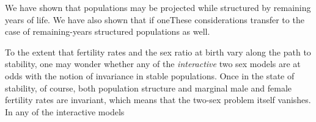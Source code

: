 We have shown that populations may be projected while structured by
remaining years of life. We have also shown that if oneThese considerations
transfer to the case of remaining-years structured populations as well. 

To the extent that fertility rates and the sex ratio at
birth vary along the path to stability, one may wonder whether any of the
\textit{interactive} two sex models are at odds with the notion of invariance 
in stable populations. Once in the state of stability, of course, both population 
structure and marginal male and female fertility rates are invariant, which
means that the two-sex problem itself vanishes. In any of the interactive models
